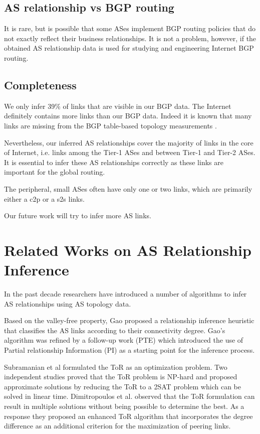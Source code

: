 \documentclass[conference]{IEEEtran}
\begin{document}
\subsection{AS relationship vs BGP routing}
It is rare, but is possible that some ASes implement BGP routing policies that do not exactly reflect their business relationships. It is not a problem, however, if the obtained AS relationship data is used for studying and engineering Internet BGP routing.  

\subsection{Completeness}
We only infer 39\% of links that are visible in our BGP data. The Internet definitely contains  more links than our BGP data. 
Indeed it is  known that many links are missing from the BGP table-based topology measurements \cite{Chang:2006,Oliveira:2008,darkmatter}. 

Nevertheless, our inferred AS relationships cover the majority of  links in the core of  Internet, i.e. links among the Tier-1 ASes and between Tier-1 and Tier-2 ASes.  It is essential to  infer these AS relationships correctly as these links are  important for the global routing. 

The peripheral, small ASes often have only one or two links, which are primarily either a c2p or a s2s links. 


Our future work  will try to infer more AS links. 


\section{Related Works on AS Relationship Inference}

In the past decade researchers have introduced a number of algorithms to infer AS relationships using  AS topology data.

Based on the valley-free property, Gao \cite{gao1} proposed a relationship inference heuristic that classifies the AS links according to their connectivity degree. Gao's algorithm was refined by a follow-up work \cite{Xia:2004} (PTE) which introduced the use of Partial relationship Information (PI) as a starting point for the inference process.

Subramanian et al \cite{Subramanian1} formulated the ToR as an optimization problem. Two independent studies \cite{Erlebach1, Battista2} proved that the ToR problem is NP-hard and proposed approximate solutions by reducing the ToR to a 2SAT problem which can be solved in linear time. Dimitropoulos et al. \cite{Dimitropoulos2} observed that the ToR formulation can result in multiple solutions without being possible to determine the best. As a response they proposed an enhanced ToR algorithm that incorporates the degree difference as an additional criterion for the maximization of peering links. 
\end{document}
